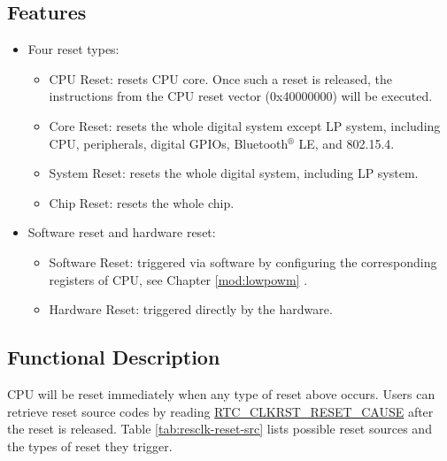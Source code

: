 \documentclass[main\_\_EN.tex]{subfiles}
\begin{document}
\subsection{Features}
\label{sec:resclk-features}
\begin{itemize}
    \item Four reset types:
    \begin{itemize}
    \item CPU Reset: resets CPU core. Once such a reset is released, the instructions from the CPU reset vector (0x40000000)  will be executed.
    \item Core Reset: resets the whole digital system except LP system, including CPU, peripherals, digital GPIOs, Bluetooth$^®$ LE, and 802.15.4.
    \item System Reset: resets the whole digital system, including LP system.
    \item Chip Reset: resets the whole chip.
    \end{itemize}
    \item Software reset and hardware reset:
    \begin{itemize}
        \item Software Reset: triggered via software by configuring the corresponding registers of CPU, see Chapter \ref{mod:lowpowm} \textit{}.
        \item Hardware Reset: triggered directly by the hardware.
    \end{itemize}
\end{itemize}

\subsection{Functional Description}
CPU will be reset immediately when any type of reset above occurs. Users can retrieve reset source codes by reading  \hyperref[fielddesc:RTCCLKRSTRESETCAUSE]{RTC\_CLKRST\_RESET\_CAUSE} after the reset is released.
Table \ref{tab:resclk-reset-src} lists possible reset sources and the types of reset they trigger.
\end{document}
